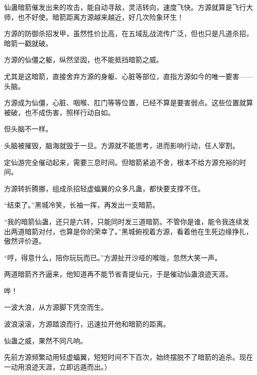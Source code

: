 \begin{this_body}
仙蛊暗箭催发出来的攻击，能自动寻敌，灵活转向，速度飞快。方源就算是飞行大师，也不好使。暗箭距离方源越来越近，好几次险象环生！

方源的防御杀招发甲，虽然性价比高，在五域乱战流传广泛，但也只是凡道杀招，暗箭一戳就破。

方源的仙僵之躯，纵然坚固，也不能抵挡暗箭之威。

尤其是这暗箭，直接舍弃方源的身躯、心脏等部位，直指方源如今的唯一要害——头脑。

方源成为仙僵，心脏、咽喉、肛门等等位置，已经不算是要害弱点。这些位置就算被破，也不成伤害，照样行动自如。

但头脑不一样。

头脑被摧毁，脑海就毁于一旦。方源就不能思考，进而影响行动，任人宰割。

定仙游完全催动起来，需要三息时间。但暗箭紧追不舍，根本不给方源充裕的时间。

方源转折腾挪，组成杀招轻虚蝠翼的众多凡蛊，都快要支撑不住。

“结束了。”黑城冷笑，长袖一挥，再发出一支暗箭。

“我的暗箭仙蛊，还只是六转，只能同时发三道暗箭。不管你是谁，能令我连续发出两道暗箭对付，也算是你的荣幸了。”黑城俯视着方源，看着他在生死边缘挣扎，傲然评价道。

“哼，得意什么，陪你玩玩而已。”方源扯开沙哑的喉咙，忽然大笑一声。

两道暗箭齐齐逼来，他知道再不能节省青提仙元，于是催动仙蛊浪迹天涯。

哗！

一波大浪，从方源脚下凭空而生。

波浪滚滚，方源踏浪而行，迅速拉开他和暗箭的距离。

仙蛊之威，果然不同凡响。

先前方源频繁动用轻虚蝠翼，短短时间不下百次，始终摆脱不了暗箭的追杀。现在一动用浪迹天涯，立即远遁而出。）

\end{this_body}

